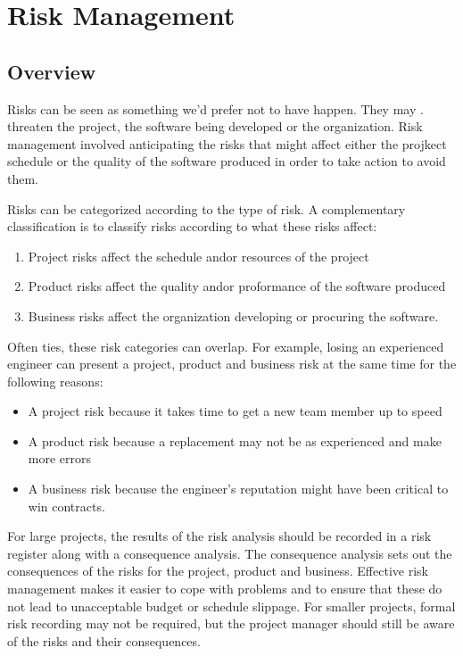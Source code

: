 \chapter{Risk Management}
\section{Overview}
Risks can be seen as something we'd prefer not to have happen. They may . threaten the project, the software being developed or the organization. Risk management involved anticipating the risks that might affect either the projkect schedule or the quality of the software produced in order to take action to avoid them.

Risks can be categorized according to the type of risk. A complementary classification is to classify risks according to what these risks affect:
\begin{enumerate}
    \item Project risks affect the schedule and\/or resources of the project
    \item Product risks affect the quality and\/or proformance of the software produced
    \item Business risks affect the organization developing or procuring the software.
\end{enumerate}

Often ties, these risk categories can overlap. For example, losing an experienced engineer can present a project, product and business risk at the same time for the following reasons:
\begin{itemize}
    \item A project risk because it takes time to get a new team member up to speed
    \item A product risk because a replacement may not be as experienced and make more errors
    \item A business risk because the engineer's reputation might have been critical to win contracts.
\end{itemize}

For large projects, the results of the risk analysis should be recorded in a risk register along with a consequence analysis. The consequence analysis sets out the consequences of the risks for the project, product and business. Effective risk management makes it easier to cope with problems and to ensure that these do not lead to unacceptable budget or schedule slippage. For smaller projects, formal risk recording may not be required, but the project manager should still be aware of the risks and their consequences.

